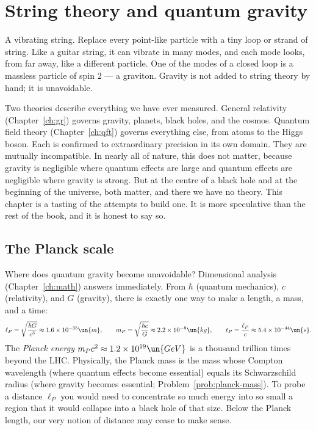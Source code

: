 \chapter{String theory and quantum gravity}
\label{ch:strings}



\begin{prototype}
A vibrating string. Replace every point-like particle with a tiny loop or strand of string. Like a guitar string, it can vibrate in many modes, and each mode looks, from far away, like a different particle. One of the modes of a closed loop is a massless particle of spin $2$ --- a graviton. Gravity is not added to string theory by hand; it is unavoidable.
\end{prototype}

Two theories describe everything we have ever measured. General relativity (Chapter~\ref{ch:gr}) governs gravity, planets, black holes, and the cosmos. Quantum field theory (Chapter~\ref{ch:qft}) governs everything else, from atoms to the Higgs boson. Each is confirmed to extraordinary precision in its own domain. They are mutually incompatible. In nearly all of nature, this does not matter, because gravity is negligible where quantum effects are large and quantum effects are negligible where gravity is strong. But at the centre of a black hole and at the beginning of the universe, both matter, and there we have no theory. This chapter is a tasting of the attempts to build one. It is more speculative than the rest of the book, and it is honest to say so.

\section{The Planck scale}

Where does quantum gravity become unavoidable? Dimensional analysis (Chapter~\ref{ch:math}) answers immediately. From $\hbar$ (quantum mechanics), $c$ (relativity), and $G$ (gravity), there is exactly one way to make a length, a mass, and a time:
\[
  \ell_P = \sqrt{\frac{\hbar G}{c^3}}\approx1.6\times10^{-35}\un{m},\qquad
  m_P = \sqrt{\frac{\hbar c}{G}}\approx2.2\times10^{-8}\un{kg},\qquad
  t_P = \frac{\ell_P}{c}\approx5.4\times10^{-44}\un{s}.
\]
The \emph{Planck energy} $m_Pc^2\approx1.2\times10^{19}\un{GeV}$ is a thousand trillion times beyond the LHC. Physically, the Planck mass is the mass whose Compton wavelength (where quantum effects become essential) equals its Schwarzschild radius (where gravity becomes essential; Problem~\ref{prob:planck-mass}). To probe a distance $\ell_P$ you would need to concentrate so much energy into so small a region that it would collapse into a black hole of that size. Below the Planck length, our very notion of distance may cease to make sense.

